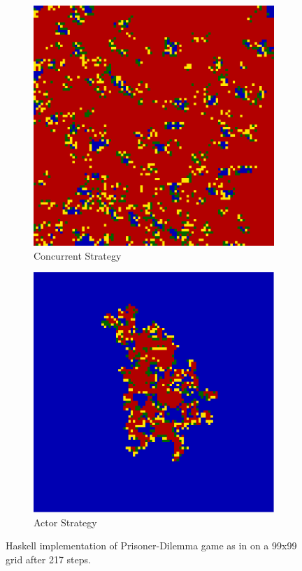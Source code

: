 \begin{figure}
\begin{subfigure}[b]{0.475\textwidth}
            \centering 
            \includegraphics[width=.4\textwidth, angle=0]{./fig/con_99x99_436steps_MSG_haskell.png}
            \caption[]%
            {{\small Concurrent Strategy}}    
            \label{fig:con_strat}
        \end{subfigure}
        \quad
        \begin{subfigure}[b]{0.475\textwidth}   
            \centering 
            \includegraphics[width=.4\textwidth, angle=0]{./fig/act_99x99_436steps_MSG_haskell.png}
            \caption[]%
            {{\small Actor Strategy}}    
            \label{fig:act_strat}
        \end{subfigure}
        \caption[]
        {\small Haskell implementation of Prisoner-Dilemma game as in \cite{huberman_evolutionary_1993} on a 99x99 grid after 217 steps.} 
        \label{fig:prisoner_strategies}
    \end{figure}
    
